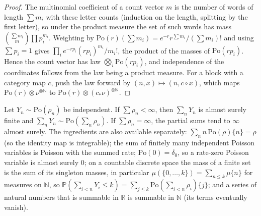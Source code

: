 \begin{proof}
  \leanok
The multinomial coefficient of a count vector $m$ is the number of words of length $\sum m_i$ with these letter counts (induction on the length, splitting by the first letter), so under the product measure the set of such words has mass
$\binom{\sum m_i}{m}\prod p_i^{m_i}$. Weighting by $\mathrm{Po}(r)(\sum m_i)=e^{-r}r^{\sum m_i}/(\sum m_i)!$ and using $\sum p_i=1$ gives $\prod_i e^{-rp_i}(rp_i)^{m_i}/m_i!$, the product of the masses of $\mathrm{Po}(rp_i)$.
Hence the count vector has law $\bigotimes_i\mathrm{Po}(rp_i)$, and independence of the coordinates follows from the law being a product measure. For a block with a category map $c$, push the law forward by $(n,x)\mapsto(n,c\circ x)$, which maps $\mathrm{Po}(r)\otimes\nu^{\otimes\mathbb N}$ to $\mathrm{Po}(r)\otimes(c_*\nu)^{\otimes\mathbb N}$.
\end{proof}

\begin{lemma}\label{lem:sg:poisson-sum}
  \leanok
Let $Y_n\sim\mathrm{Po}(\rho_n)$ be independent. If $\sum\rho_n<\infty$, then $\sum_nY_n$ is almost surely finite and $\sum_nY_n\sim\mathrm{Po}(\sum_n\rho_n)$. If $\sum\rho_n=\infty$, the partial sums tend to $\infty$ almost surely. The ingredients are also available separately: $\sum_nn\,\mathrm{Po}(\rho)\{n\}=\rho$ (so the identity map is integrable); the sum of finitely many independent Poisson variables is Poisson with the summed rate; $\mathrm{Po}(0)=\delta_0$, so a rate-zero Poisson variable is almost surely $0$; on a countable discrete space the mass of a finite set is the sum of its singleton masses, in particular $\mu(\{0,\dots,k\})=\sum_{n\le k}\mu\{n\}$ for measures on $\mathbb N$, so $\mathbb P(\sum_{i<n}Y_i\le k)=\sum_{j\le k}\mathrm{Po}(\sum_{i<n}\rho_i)\{j\}$; and a series of natural numbers that is summable in $\mathbb R$ is summable in $\mathbb N$ (its terms eventually vanish).
\end{lemma}

